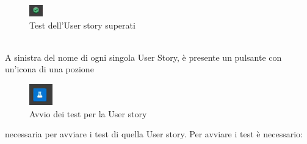 \documentclass{article}
\begin{document}
    \hfill
    \begin{figure}[H]
      \centering
      \includegraphics{documenti/Screenshot manuale utente/tic.png}
      \caption{Test dell'User story superati}
      \label{testsup}
    \end{figure}
\\

A sinistra del nome di ogni singola User Story, è presente un pulsante con un'icona di una pozione
    \begin{figure}[H]
      \centering
      \includegraphics{documenti/Screenshot manuale utente/pozione.png}
      \caption{Avvio dei test per la User story}
      \label{testus}
    \end{figure}
necessaria per avviare i test di quella User story. Per avviare i test è necessario:
\end{document}

